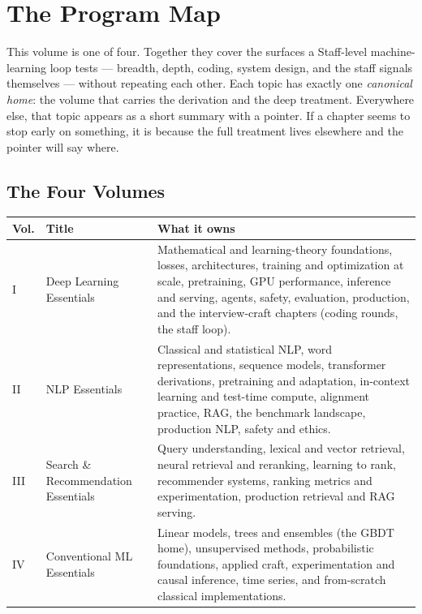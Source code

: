 \chapter*{The Program Map}

This volume is one of four. Together they cover the surfaces a Staff-level machine-learning loop tests --- breadth, depth, coding, system design, and the staff signals themselves --- without repeating each other. Each topic has exactly one \emph{canonical home}: the volume that carries the derivation and the deep treatment. Everywhere else, that topic appears as a short summary with a pointer. If a chapter seems to stop early on something, it is because the full treatment lives elsewhere and the pointer will say where.

\section*{The Four Volumes}

\begin{tabularx}{\textwidth}{@{}l l X@{}}
\toprule
\textbf{Vol.} & \textbf{Title} & \textbf{What it owns} \\
\midrule
I & Deep Learning Essentials & Mathematical and learning-theory foundations, losses, architectures, training and optimization at scale, pretraining, GPU performance, inference and serving, agents, safety, evaluation, production, and the interview-craft chapters (coding rounds, the staff loop). \\
II & NLP Essentials & Classical and statistical NLP, word representations, sequence models, transformer derivations, pretraining and adaptation, in-context learning and test-time compute, alignment practice, RAG, the benchmark landscape, production NLP, safety and ethics. \\
III & Search \& Recommendation Essentials & Query understanding, lexical and vector retrieval, neural retrieval and reranking, learning to rank, recommender systems, ranking metrics and experimentation, production retrieval and RAG serving. \\
IV & Conventional ML Essentials & Linear models, trees and ensembles (the GBDT home), unsupervised methods, probabilistic foundations, applied craft, experimentation and causal inference, time series, and from-scratch classical implementations. \\
\bottomrule
\end{tabularx}

